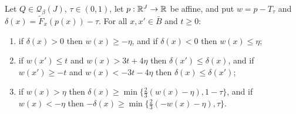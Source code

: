 \begin{lemma}\label{m:lem:qrep}
Let $Q\in\mathcal Q_\beta(J)$, $\tau\in(0,1)$, let $p:\mathbb{R}^J\to\mathbb{R}$ be affine, and put $w=p-T_\tau$ and $\delta(x)=\tilde F_x(p(x))-\tau$. For all $x,x'\in\bar B$ and $t\ge0$:
\begin{enumerate}[label=(\roman*),nosep]
\item if $\delta(x)>0$ then $w(x)\ge-\eta$, and if $\delta(x)<0$ then $w(x)\le\eta$;
\item if $w(x')\le t$ and $w(x)>3t+4\eta$ then $\delta(x')\le\delta(x)$, and if $w(x')\ge-t$ and $w(x)<-3t-4\eta$ then $\delta(x)\le\delta(x')$;
\item if $w(x)>\eta$ then $\delta(x)\ge\min\{\frac23(w(x)-\eta),1-\tau\}$, and if $w(x)<-\eta$ then $-\delta(x)\ge\min\{\frac23(-w(x)-\eta),\tau\}$.
\end{enumerate}
\end{lemma}

